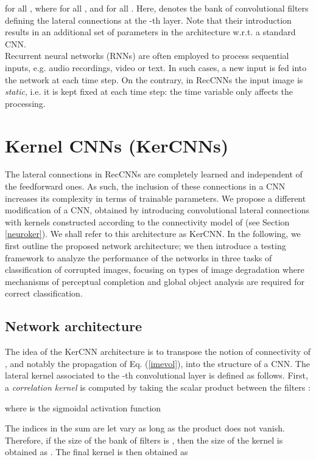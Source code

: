 \documentclass[11pt,oneside,reqno]{amsart}
\begin{document}
 for all , where  for all , and  for all . Here,  denotes the bank of convolutional filters defining the lateral connections at the -th layer. Note that their introduction results in an additional set of parameters in the architecture w.r.t. a standard CNN.\\
 Recurrent neural networks (RNNs) are often employed to process sequential inputs, e.g. audio recordings, video or text. In such cases, a new input  is fed into the network at each time step. On the contrary, in RecCNNs the input image  is \emph{static}, i.e. it is kept fixed at each time step: the time variable only affects the processing.
 
 
 
 \section{Kernel CNNs (KerCNNs)}
 
 The lateral connections in RecCNNs are completely learned and independent of the feedforward ones. As such, the inclusion of these connections in a CNN increases its complexity in terms of trainable parameters. We propose a different modification of a CNN, obtained by introducing convolutional lateral connections with kernels constructed according to the connectivity model of \citet{neuro,metric} (see Section \ref{neuroker}). We shall refer to this architecture as KerCNN. In the following, we first outline the proposed network architecture; we then introduce a testing framework to analyze the performance of the networks in three tasks of classification of corrupted images, focusing on types of image degradation where mechanisms of perceptual completion and global object analysis are required for correct classification.
 
 \subsection{Network architecture}\label{archi}
 
 The idea of the KerCNN architecture is to transpose the notion of connectivity of \citet{neuro,metric}, and notably the propagation of Eq. (\ref{imevol}), into the structure of a CNN. The lateral kernel  associated to the -th convolutional layer is defined as follows. First, a \emph{correlation kernel}  is computed by taking the  scalar product between the filters :
 
 where  is the sigmoidal activation function
 
 The indices in the sum are let vary as long as the product  does not vanish. Therefore, if the size of the bank of filters  is , then the size of the kernel is obtained as .
 The final kernel is then obtained as
 
\end{document}
